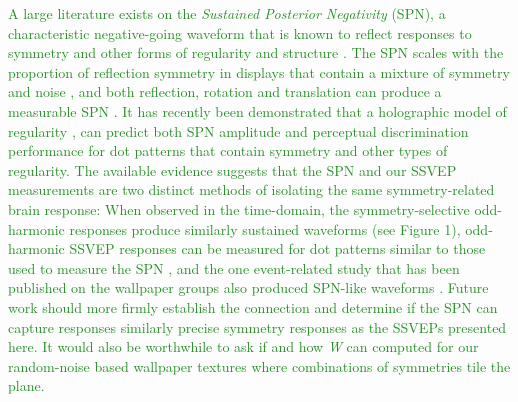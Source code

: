 \documentclass[11pt, twoside]{article}
\begin{document}
\textcolor{ForestGreen}{A large literature exists on the \textit{Sustained Posterior Negativity} (SPN), a characteristic negative-going waveform that is known to reflect responses to symmetry and other forms of regularity and structure \citep{makin_2016}. The SPN scales with the proportion of reflection symmetry in displays that contain a mixture of symmetry and noise \cite{makin_formation_2020, palumbo_scaling_2015}, and both reflection, rotation and translation can produce a measurable SPN \cite{makin_electrophysiological_2013}. It has recently been demonstrated that a holographic model of regularity \citep{van_der_helm_1996}, can predict both SPN amplitude \citep{makin_2016} and perceptual discrimination performance \citep{nucci_2007} for dot patterns that contain symmetry and other types of regularity. The available evidence suggests that the SPN and our SSVEP measurements are two distinct methods of isolating the same symmetry-related brain response: When observed in the time-domain, the symmetry-selective odd-harmonic responses produce similarly sustained waveforms (see Figure 1), odd-harmonic SSVEP responses can be measured for dot patterns similar to those used to measure the SPN \citep{RN1954}, and the one event-related study that has been published on the wallpaper groups also produced SPN-like waveforms \citep{RN1959}. Future work should more firmly establish the connection and determine if the SPN can capture responses similarly precise symmetry responses as the SSVEPs presented here. It would also be worthwhile to ask if and how \textit{W} can computed for our random-noise based wallpaper textures where combinations of symmetries tile the plane.}    
\end{document}
